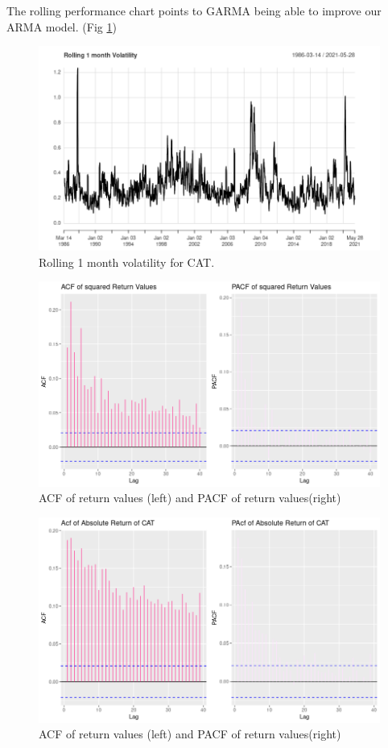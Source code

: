 \documentclass{article}
\begin{document}
\noindent The rolling performance chart points to GARMA being able to improve our ARMA model. (Fig \ref{fig:volatility})

\begin{figure}
	\centering
	\includegraphics[width=\linewidth]{monthly_volatility}
	\caption{Rolling 1 month volatility for CAT.}
	\label{fig:volatility}
\end{figure}
\begin{figure}
	\centering
	\includegraphics[width=\linewidth]{acf_pacf_squared}
	\caption{ACF of return values (left) and PACF of return values(right)}
	\label{fig:acfErr}
\end{figure}

\begin{figure}
	\centering
	\includegraphics[width=\linewidth]{acf_pacf_of_cat}
	\caption{ACF of return values (left) and PACF of return values(right)}
	\label{fig:acf}
\end{figure}
\end{document}
